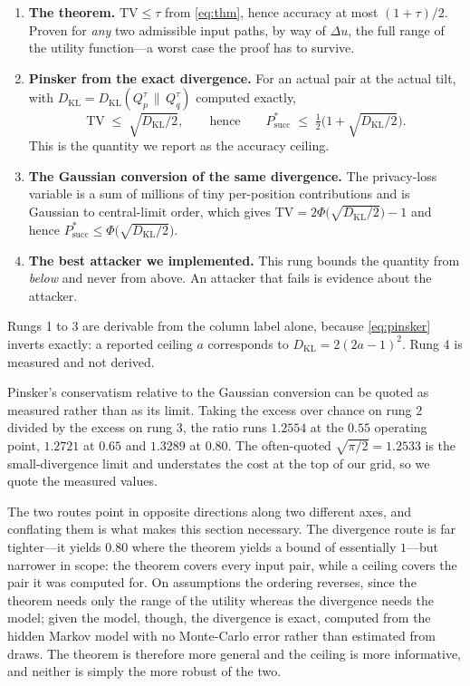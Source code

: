 \begin{enumerate}
\item \textbf{The theorem.} $\mathrm{TV} \le \tau$ from \eqref{eq:thm}, hence
accuracy at most $(1+\tau)/2$. Proven for \emph{any} two admissible input paths, by
way of $\Delta u$, the full range of the utility function---a worst case the proof
has to survive.
\item \textbf{Pinsker from the exact divergence.} For an actual pair at the actual
tilt, with $D_{\mathrm{KL}} = D_{\mathrm{KL}}(Q^{\tau}_{p} \,\|\, Q^{\tau}_{q})$
computed exactly,
\begin{equation}
\mathrm{TV} \;\le\; \sqrt{D_{\mathrm{KL}}/2},
\qquad\text{hence}\qquad
P^{*}_{\mathrm{succ}} \;\le\; \tfrac{1}{2}\Big(1 + \sqrt{D_{\mathrm{KL}}/2}\Big).
\label{eq:pinsker}
\end{equation}
This is the quantity we report as the accuracy ceiling.
\item \textbf{The Gaussian conversion of the same divergence.} The privacy-loss
variable is a sum of millions of tiny per-position contributions and is Gaussian to
central-limit order, which gives
$\mathrm{TV} = 2\Phi\big(\sqrt{D_{\mathrm{KL}}/2}\big) - 1$ and hence
$P^{*}_{\mathrm{succ}} \le \Phi\big(\sqrt{D_{\mathrm{KL}}/2}\big)$.
\item \textbf{The best attacker we implemented.} This rung bounds the quantity from
\emph{below} and never from above. An attacker that fails is evidence about the
attacker.
\end{enumerate}

Rungs 1 to 3 are derivable from the column label alone, because \eqref{eq:pinsker}
inverts exactly: a reported ceiling $a$ corresponds to
$D_{\mathrm{KL}} = 2(2a-1)^2$. Rung 4 is measured and not derived.

Pinsker's conservatism relative to the Gaussian conversion can be quoted as measured
rather than as its limit. Taking the excess over chance on rung 2 divided by the
excess on rung 3, the ratio runs $1.2554$ at the $0.55$ operating point, $1.2721$ at
$0.65$ and $1.3289$ at $0.80$. The often-quoted $\sqrt{\pi/2} = 1.2533$ is the
small-divergence limit and understates the cost at the top of our grid, so we quote
the measured values.

The two routes point in opposite directions along two different axes, and conflating
them is what makes this section necessary. The divergence route is far tighter---it
yields $0.80$ where the theorem yields a bound of essentially $1$---but narrower in
scope: the theorem covers every input pair, while a ceiling covers the pair it was
computed for. On assumptions the ordering reverses, since the theorem needs only the
range of the utility whereas the divergence needs the model; given the model, though,
the divergence is exact, computed from the hidden Markov model with no Monte-Carlo
error rather than estimated from draws. The theorem is therefore more general and the
ceiling is more informative, and neither is simply the more robust of the two.

